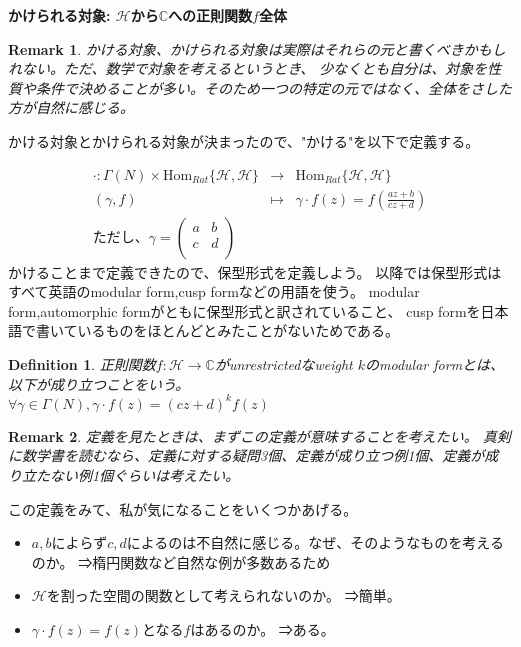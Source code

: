 \documentclass{ujarticle}
\newtheorem{dfn}[thm]{Definition}
\newtheorem*{rem}{Remark}
\begin{document}
\noindent \bf{かけられる対象:}
$\mathcal{H}$から$\mathbb{C}$への正則関数$f$全体

\begin{rem}
  かける対象、かけられる対象は実際はそれらの元と書くべきかもしれない。ただ、数学で対象を考えるというとき、
  少なくとも自分は、対象を性質や条件で決めることが多い。そのため一つの特定の元ではなく、全体をさした方が自然に感じる。
\end{rem}

\noindent かける対象とかけられる対象が決まったので、"かける"を以下で定義する。

\begin{eqnarray*}
  \cdot :  \Gamma(N) \times \mathrm{Hom}_{Rat}\{\mathcal{H},\mathcal{H}\} & \to & \mathrm{Hom}_{Rat}\{\mathcal{H},\mathcal{H}\} \\
  (\gamma,f) &\mapsto &\gamma \cdot f(z) = f(\frac{az + b}{cz + d})　\\
\mbox{ただし、} \gamma =
\begin{pmatrix}
  a & b \\
  c & d \\
\end{pmatrix}
\end{eqnarray*}
かけることまで定義できたので、保型形式を定義しよう。
以降では保型形式はすべて英語のmodular form,cusp formなどの用語を使う。
modular form,automorphic formがともに保型形式と訳されていること、
cusp formを日本語で書いているものをほとんどとみたことがないためである。

\begin{dfn}
  正則関数$f:\mathcal{H} \to \mathbb{C}$がunrestrictedなweight $k$のmodular formとは、以下が成り立つことをいう。 \\
  $\forall  \gamma \in \Gamma(N),  \gamma \cdot f(z) = (cz + d)^{k}f(z)$
\end{dfn}
\begin{rem}
  定義を見たときは、まずこの定義が意味することを考えたい。
  真剣に数学書を読むなら、定義に対する疑問3個、定義が成り立つ例1個、定義が成り立たない例1個ぐらいは考えたい。
\end{rem}
この定義をみて、私が気になることをいくつかあげる。
\begin{itemize}
  \setlength{\parskip}{0cm} %
  \setlength{\itemsep}{0cm} %
  \item $a,b$によらず$c,d$によるのは不自然に感じる。なぜ、そのようなものを考えるのか。
  ⇒楕円関数など自然な例が多数あるため
  \item $\mathcal{H}$を割った空間の関数として考えられないのか。
  ⇒簡単。
  \item $\gamma \cdot f (z) = f(z)$となる$f$はあるのか。
  ⇒ある。
\end{itemize}
\end{document}
